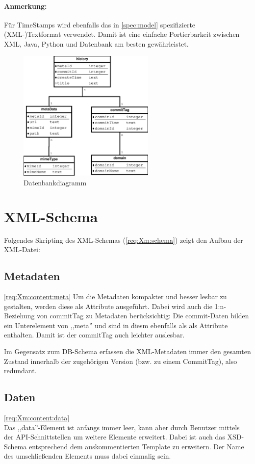 \paragraph{Anmerkung:} Für TimeStamps wird ebenfalls das in \ref{spec:model} spezifizierte (XML-)Textformat
verwendet. Damit ist eine einfache Portierbarkeit zwischen XML, Java, Python und Datenbank am besten gewährleistet.

\begin{figure}[h]
	\centering
	\label{dia:design:frontend:data:db}
	\includegraphics[width=0.6\textwidth]{design/data/db.eps}
	\caption{Datenbankdiagramm}
\end{figure}

\section{XML-Schema}
Folgendes Skripting des XML-Schemas (\ref{req:Xm:schema}) zeigt den Aufbau der XML-Datei:

\subsection{Metadaten}
\ref{req:Xm:content:meta}
Um die Metadaten kompakter und besser lesbar zu gestalten, 
werden diese als Attribute ausgeführt. 
Dabei wird auch die 1:n-Beziehung von commitTag zu Metadaten berücksichtig:
Die commit-Daten bilden ein Unterelement von ,,meta'' und sind in diesm ebenfalls als
als Attribute enthalten.
Damit ist der commitTag auch leichter auslesbar.


Im Gegensatz zum DB-Schema erfassen die XML-Metadaten immer den gesamten Zustand innerhalb der zugehörigen Version (bzw. zu einem CommitTag), also redundant. 
\subsection{Daten}
\ref{req:Xm:content:data} \\
Das ,,data''-Element ist anfangs immer leer, kann aber durch Benutzer mittels der API-Schnittstellen 
um weitere Elemente erweitert.
Dabei ist auch das XSD-Schema entsprechend dem auskommentierten Template zu erweitern.
Der Name des umschließenden Elements muss dabei einmalig sein.

